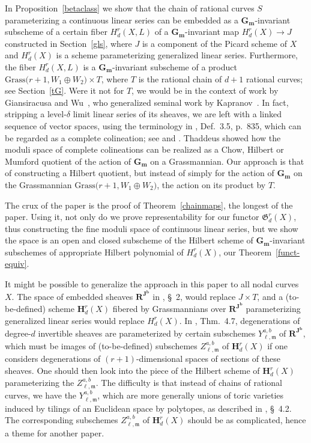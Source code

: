\documentclass[a4paper,11pt]{amsart}
\theoremstyle{plain}
\theoremstyle{definition}
\theoremstyle{remark}
\def\cc{{\mathbf G}_{\mathbf m}}
\begin{document}
In Proposition~\ref{betaclass} we show that the chain of rational curves $S$ parameterizing a continuous linear series can be embedded as a $\cc$-invariant subscheme of a certain fiber $H^r_d(X,L)$ of a $\cc$-invariant map $H^r_d(X)\to J$ constructed in Section~\ref{gls}, where $J$ is a component of the Picard scheme of $X$ and $H^r_d(X)$ is a scheme parameterizing generalized linear series. Furthermore, the fiber $H^r_d(X,L)$ is a $\cc$-invariant subscheme of a product $\text{Grass}\big(r+1,W_1\oplus W_2\big)\times T$, where $T$ is the rational chain of $d+1$ rational curves; see Section~\ref{tG}. Were it not for $T$, we would be in the context of work by Giansiracusa and Wu~\cite{GW22}, who generalized seminal work by Kapranov~\cite{Kap-chow, GKZ}. In fact, stripping a level-$\delta$ limit linear series of its sheaves, we are left with a linked sequence of vector spaces, using the terminology in \cite{ENR}, Def.~3.5, p.~835, which can be regarded as a complete colineation; see \cite{Tha} and \cite{VE}. Thaddeus \cite{Tha} showed how the moduli space of complete colineations can be realized as a Chow, Hilbert or Mumford quotient of the action of $\cc$ on a Grassmannian. Our approach is that of constructing a Hilbert quotient, but instead of simply for the action of $\cc$ on the Grassmannian $\text{Grass}\big(r+1,W_1\oplus W_2\big)$, the action on its product by $T$.

The crux of the paper is the proof of Theorem~\ref{chainmaps},
the longest of the paper. Using it, not only do we prove representability for our functor $\mathfrak{G}_d^r(X)$, thus constructing the fine moduli space of continuous linear series, but we show the space is an open and closed subscheme of the Hilbert scheme of $\cc$-invariant subschemes of appropriate Hilbert polynomial of $H^r_d(X)$, our Theorem~\ref{funct-equiv}. 

It might be possible to generalize the approach in this paper to all nodal curves $X$. The space of embedded sheaves $\mathbf R^{\mathbf J^{\mathbf b}}$ in \cite{AEc}, \S~2, would replace $J\times T$, and a (to-be-defined) scheme $\mathbf H^r_d(X)$ fibered by Grassmannians over $\mathbf R^{\mathbf J^{\mathbf b}}$ parameterizing generalized linear series would replace $H^r_d(X)$. In \cite{AEc}, Thm.~4.7, degenerations of degree-$d$ invertible sheaves are parameterized by certain subschemes $Y^{a,b}_{\ell,\mathfrak m}$ of $\mathbf R^{\mathbf J^{\mathbf b}}$, which must be images of (to-be-defined) subschemes $Z^{a,b}_{\ell,\mathfrak m}$ of $\mathbf H^r_d(X)$ if one considers degenerations of $(r+1)$-dimensional spaces of sections of these sheaves. One should then look into the piece of the Hilbert scheme of $\mathbf H^r_d(X)$ parameterizing the $Z^{a,b}_{\ell,\mathfrak m}$. The difficulty is that instead of chains of rational curves, we have the  $Y^{a,b}_{\ell,\mathfrak m}$, which are more generally unions of toric varieties induced by tilings of an Euclidean space by polytopes, as described in \cite{AEb}, \S~4.2. The corresponding subschemes $Z^{a,b}_{\ell,\mathfrak m}$ of $\mathbf H^r_d(X)$ should be as complicated, hence a theme for another paper. 
\end{document}

